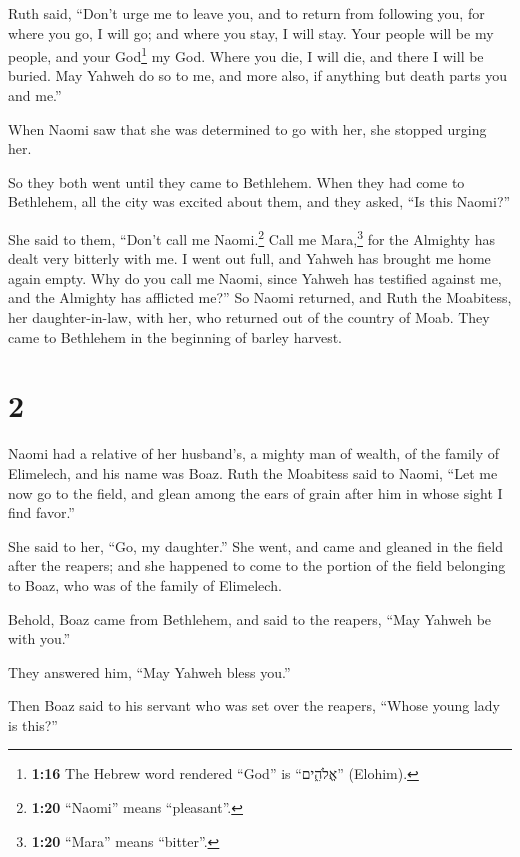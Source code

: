  Ruth said, ``Don't urge me to leave you, and to return
from following you, for where you go, I will go; and where you stay, I
will stay. Your people will be my people, and your God\footnote{\textbf{1:16}
  The Hebrew word rendered ``God'' is ``אֱלֹהִ֑ים'' (Elohim).} my God.
 Where you die, I will die, and there I will be buried.
May Yahweh do so to me, and more also, if anything but death parts you
and me.''

 When Naomi saw that she was determined to go with her,
she stopped urging her.

 So they both went until they came to Bethlehem. When
they had come to Bethlehem, all the city was excited about them, and
they asked, ``Is this Naomi?''

 She said to them, ``Don't call me Naomi.\footnote{\textbf{1:20}
  ``Naomi'' means ``pleasant''.} Call me Mara,\footnote{\textbf{1:20}
  ``Mara'' means ``bitter''.} for the Almighty has dealt very bitterly
with me.  I went out full, and Yahweh has brought me home
again empty. Why do you call me Naomi, since Yahweh has testified
against me, and the Almighty has afflicted me?''  So
Naomi returned, and Ruth the Moabitess, her daughter-in-law, with her,
who returned out of the country of Moab. They came to Bethlehem in the
beginning of barley harvest.

\hypertarget{section-1}{%
\section{2}\label{section-1}}

 Naomi had a relative of her husband's, a mighty man of
wealth, of the family of Elimelech, and his name was Boaz.
 Ruth the Moabitess said to Naomi, ``Let me now go to the
field, and glean among the ears of grain after him in whose sight I find
favor.''

She said to her, ``Go, my daughter.''  She went, and came
and gleaned in the field after the reapers; and she happened to come to
the portion of the field belonging to Boaz, who was of the family of
Elimelech.

 Behold, Boaz came from Bethlehem, and said to the
reapers, ``May Yahweh be with you.''

They answered him, ``May Yahweh bless you.''

 Then Boaz said to his servant who was set over the
reapers, ``Whose young lady is this?''

